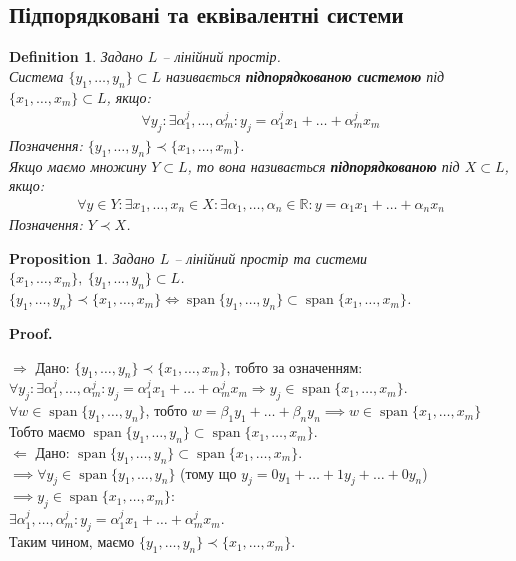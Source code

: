 \documentclass[a4paper, 10pt]{article}
\makeatletter
\def\rightproof{$\boxed{\Rightarrow}$ }
\def\leftproof{$\boxed{\Leftarrow}$ }
\theoremstyle{theoremdd}
\newtheorem{definition}[theorem]{Definition}
\newtheorem{proposition}[theorem]{Proposition}
\DeclareMathOperator{\linspan}{span}
\renewenvironment{proof}[1][Proof.\\]{\par
\pushQED{\hfill \qed}%
\normalfont \topsep6\p@\@plus6\p@\relax
\trivlist
\item\relax
{\bfseries
#1\@addpunct{.}}\hspace\labelsep\ignorespaces
}{%
\popQED\endtrivlist\@endpefalse
}
\makeatother
\begin{document}
	\subsection{Підпорядковані та еквівалентні системи}
	\begin{definition}
	Задано $L$ -- лінійний простір.\\
	Система $\{y_1, \dots, y_n \} \subset L$ називається \textbf{підпорядкованою системою} під $\{x_1, \dots, x_m\} \subset L$, якщо:
	\begin{align*}
	\forall y_j: \exists \alpha^j_1, \dots, \alpha^j_m: y_j = \alpha^j_1 x_1 + \dots + \alpha^j_m x_m
	\end{align*}
	Позначення: $\{y_1, \dots, y_n \} \prec \{x_1, \dots, x_m \}$.\\
	Якщо маємо множину $Y \subset L$, то вона називається \textbf{підпорядкованою} під $X \subset L$, якщо:
	\begin{align*}
	\forall y \in Y: \exists x_1,\dots,x_n \in X: \exists \alpha_1, \dots, \alpha_n \in \mathbb{R}: y = \alpha_1 x_1 + \dots + \alpha_n x_n
	\end{align*}
	Позначення: $Y \prec X$.
	\end{definition}
	
	\begin{proposition}
	\label{subordinate_prp1}
	Задано $L$ -- лінійний простір та системи $\{x_1,\dots,x_m\},\ \{y_1,\dots,y_n\} \subset L$.\\
	$\{y_1, \dots, y_n \} \prec \{x_1, \dots, x_m \} \iff \linspan \{y_1, \dots, y_n\} \subset \linspan \{x_1, \dots, x_m \}$.
	\end{proposition}
	
	\begin{proof}
	\rightproof Дано: $\{y_1, \dots, y_n \} \prec \{x_1, \dots, x_m \}$, тобто за означенням:\\
	$\forall y_j: \exists \alpha^j_1, \dots, \alpha^j_m: y_j = \alpha^j_1 x_1 + \dots + \alpha^j_m x_m \Rightarrow y_j \in \linspan\{x_1, \dots, x_m\}$.\\
	$\forall w \in \linspan\{y_1, \dots, y_n\}$, тобто $w = \beta_1 y_1 + \dots + \beta_n y_n \implies w \in \linspan\{x_1, \dots, x_m\}$\\
	Тобто маємо $\linspan \{y_1, \dots, y_n\} \subset \linspan \{x_1, \dots, x_m \}$.
	\bigskip \\
	\leftproof Дано: $\linspan \{y_1, \dots, y_n\} \subset \linspan \{x_1, \dots, x_m \}$.\\
	$\implies \forall y_j \in \linspan \{y_1, \dots, y_n \}$ \hspace{0.2cm}(тому що $y_j = 0y_1 + \dots + 1 y_j + \dots + 0 y_n$)\hspace{0.2cm} $\implies y_j \in \linspan\{x_1,\dots,x_m\}$:\\
	$\exists \alpha^j_1, \dots, \alpha^j_m: y_j = \alpha^j_1 x_1 + \dots + \alpha^j_m x_m$.\\
	Таким чином, маємо $\{y_1, \dots, y_n \} \prec \{x_1, \dots, x_m \}$.
	\end{proof}
	
\end{document}
